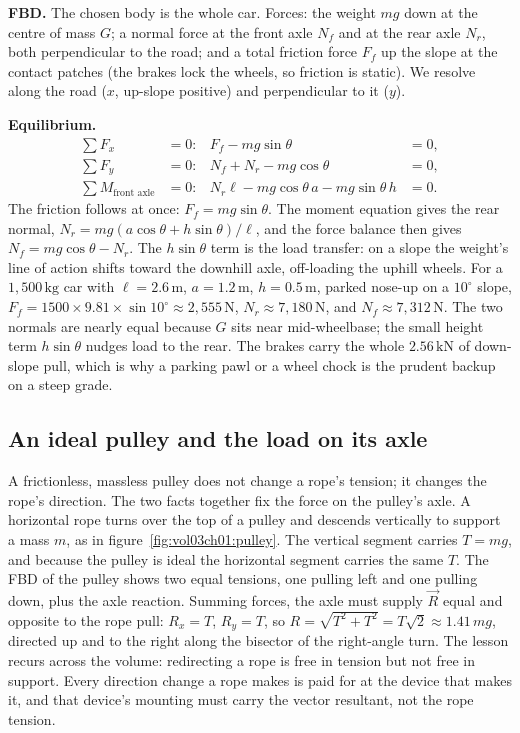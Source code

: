 \textbf{FBD.} The chosen body is the whole car. Forces: the weight $mg$
down at the centre of mass $G$; a normal force at the front axle $N_f$
and at the rear axle $N_r$, both perpendicular to the road; and a total
friction force $F_f$ up the slope at the contact patches (the brakes
lock the wheels, so friction is static). We resolve along the road
($x$, up-slope positive) and perpendicular to it ($y$).

\textbf{Equilibrium.}
\begin{align*}
\sum F_x &= 0: & F_f - mg\sin\theta &= 0, \\
\sum F_y &= 0: & N_f + N_r - mg\cos\theta &= 0, \\
\sum M_{\text{front axle}} &= 0: & N_r \ell - mg\cos\theta\, a -
mg\sin\theta\, h &= 0.
\end{align*}
The friction follows at once: $F_f = mg\sin\theta$. The moment equation
gives the rear normal, $N_r = mg(a\cos\theta + h\sin\theta)/\ell$, and
the force balance then gives $N_f = mg\cos\theta - N_r$. The
$h\sin\theta$ term is the load transfer: on a slope the weight's line of
action shifts toward the downhill axle, off-loading the uphill wheels.
For a $1{,}500\,\si{\kilogram}$ car with $\ell = 2.6\,\si{\meter}$,
$a = 1.2\,\si{\meter}$, $h = 0.5\,\si{\meter}$, parked nose-up on a
$10^{\circ}$ slope, $F_f = 1500 \times 9.81 \times \sin 10^{\circ}
\approx 2{,}555\,\text{N}$, $N_r \approx 7{,}180\,\text{N}$, and
$N_f \approx 7{,}312\,\text{N}$. The two normals are nearly equal
because $G$ sits near mid-wheelbase; the small height term $h\sin\theta$
nudges load to the rear. The brakes carry the whole $2.56\,\text{kN}$
of down-slope pull, which is why a parking pawl or a wheel chock is the
prudent backup on a steep grade.

\subsection{An ideal pulley and the load on its axle}



A frictionless, massless pulley does not change a rope's tension; it
changes the rope's direction. The two facts together fix the force on
the pulley's axle. A horizontal rope turns over the top of a pulley and
descends vertically to support a mass $m$, as in
figure~\ref{fig:vol03ch01:pulley}. The vertical segment carries
$T = mg$, and because the pulley is ideal the horizontal segment carries
the same $T$. The FBD of the pulley shows two equal tensions, one
pulling left and one pulling down, plus the axle reaction. Summing
forces, the axle must supply $\vec{R}$ equal and opposite to the rope
pull: $R_x = T$, $R_y = T$, so $R = \sqrt{T^2 + T^2} = T\sqrt{2} \approx
1.41\,mg$, directed up and to the right along the bisector of the
right-angle turn. The lesson recurs across the volume: redirecting a
rope is free in tension but not free in support. Every direction change
a rope makes is paid for at the device that makes it, and that device's
mounting must carry the vector resultant, not the rope tension.

